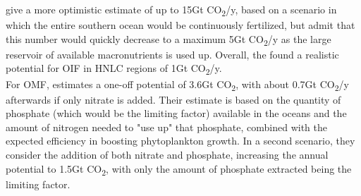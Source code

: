 \textcite{Keller2014PotentialScenario} give a more optimistic estimate of up to 15Gt CO\textsubscript{2}/y, based on a scenario in which the entire southern ocean would be continuously fertilized, but admit that this number would quickly decrease to a maximum 5Gt CO\textsubscript{2}/y as the large reservoir of available macronutrients is used up.
Overall, the \textcite[87]{NAS2022ASequestration} found a realistic potential for OIF in HNLC regions of 1Gt CO\textsubscript{2}/y.\\
For OMF, \textcite{Harrison2017GlobalFertilization} estimates a one-off potential of 3.6Gt CO\textsubscript{2}, with about 0.7Gt CO\textsubscript{2}/y afterwards if only nitrate is added. Their estimate is based on the quantity of phosphate (which would be the limiting factor) available in the oceans and the amount of nitrogen needed to "use up" that phosphate, combined with the expected efficiency in boosting phytoplankton growth. In a second scenario, they consider the addition of both nitrate and phosphate, increasing the annual potential to 1.5Gt CO\textsubscript{2}, with only the amount of phosphate extracted being the limiting factor.
